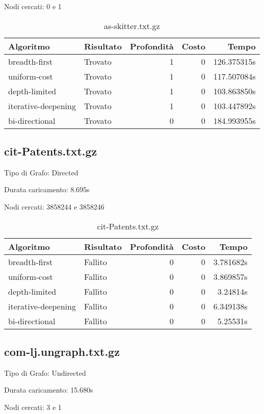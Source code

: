 Nodi cercati: 0 e 1

\begin{table}[h]
\centering
\begin{tabular}{|l|l|r|r|r|}
\hline
\textbf{Algoritmo} & \textbf{Risultato} & \textbf{Profondità} & \textbf{Costo} & \textbf{Tempo} \\
 \hline
breadth-first & Trovato & 1 & 0 & 126.375315s \\
uniform-cost & Trovato & 1 & 0 & 117.507084s \\
depth-limited & Trovato & 1 & 0 & 103.863850s \\
iterative-deepening & Trovato & 1 & 0 & 103.447892s \\
bi-directional & Trovato & 0 & 0 & 184.993955s \\
\hline
\end{tabular}
\caption{as-skitter.txt.gz}
\end{table}
\subsection{cit-Patents.txt.gz}
Tipo di Grafo: Directed

Durata caricamento: 8.695s

Nodi cercati: 3858244 e 3858246

\begin{table}[h]
\centering
\begin{tabular}{|l|l|r|r|r|}
\hline
\textbf{Algoritmo} & \textbf{Risultato} & \textbf{Profondità} & \textbf{Costo} & \textbf{Tempo} \\
 \hline
breadth-first & Fallito & 0 & 0 & 3.781682s \\
uniform-cost & Fallito & 0 & 0 & 3.869857s \\
depth-limited & Fallito & 0 & 0 & 3.24814s \\
iterative-deepening & Fallito & 0 & 0 & 6.349138s \\
bi-directional & Fallito & 0 & 0 & 5.25531s \\
\hline
\end{tabular}
\caption{cit-Patents.txt.gz}
\end{table}
\newpage
\subsection{com-lj.ungraph.txt.gz}
Tipo di Grafo: Undirected

Durata caricamento: 15.680s

Nodi cercati: 3 e 1

